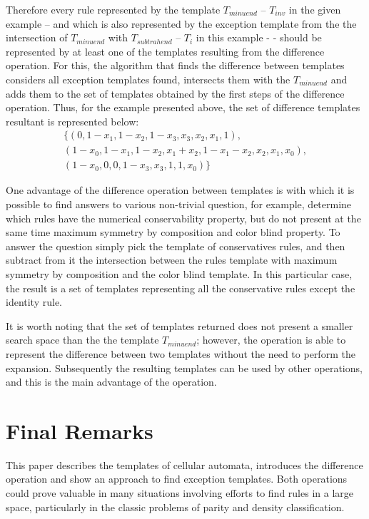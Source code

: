 \documentclass{llncs}
\begin{document}
Therefore every rule represented  by the template $T_{minuend}$ -- $T_{inv}$ in the given example -- and which is also represented by the exception template from the the intersection of $T_{minuend}$ with $T_{subtrahend}$ -- $T_i$ in this example - - should be represented by at least one of the templates resulting from the difference operation. For this, the algorithm that finds the difference between templates considers all exception templates found, intersects them with the $T_{minuend}$ and adds them to the set of templates obtained by the first steps of the difference operation. Thus, for the example presented above, the set of difference templates resultant is represented below:\begin{displaymath}
\begin{split}
\{(0, 1 - x_1, 1 - x_2, 1 - x_3, x_3, x_2, x_1, 1), \\
(1 - x_0, 1 - x_1, 1 - x_2, x_1 + x_2, 1 - x_1 - x_2, x_2, x_1, x_0), \\
(1 - x_0, 0, 0, 1 - x_3, x_3, 1, 1, x_0)\}
\label{eq:differenceR}
\end{split}
\end{displaymath}

One advantage of the difference operation between templates is with which it is possible to find answers to various non-trivial question, for example, determine which rules have the numerical conservability property, but do not present at the same time maximum symmetry by composition and color blind property. To answer the question simply pick the template of conservatives rules, and then subtract from it the intersection between the rules template with maximum symmetry by composition and the color blind template. In this particular case, the result is a set of templates representing all the conservative rules except the identity rule.

It is worth noting that the set of templates returned does not present a smaller search space than the the template $T_{minuend}$; however, the operation is able to represent the difference between two templates without the need to perform the expansion. Subsequently the resulting templates can be used by other operations, and this is the main advantage of the operation.









\section{Final Remarks}
\label{sec:consideracoes_finais}
This paper describes the templates of cellular automata, 
introduces the difference operation and show an approach to find exception templates. Both operations could prove valuable in many situations involving efforts to find rules in a large space, particularly in the classic problems of parity and density classification.
\end{document}
